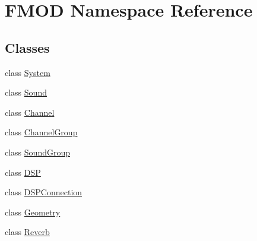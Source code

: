\hypertarget{namespace_f_m_o_d}{\section{F\-M\-O\-D Namespace Reference}
\label{namespace_f_m_o_d}
}
\subsection*{Classes}
\begin{DoxyCompactItemize}
\item 
class \hyperlink{class_f_m_o_d_1_1_system}{System}
\item 
class \hyperlink{class_f_m_o_d_1_1_sound}{Sound}
\item 
class \hyperlink{class_f_m_o_d_1_1_channel}{Channel}
\item 
class \hyperlink{class_f_m_o_d_1_1_channel_group}{Channel\-Group}
\item 
class \hyperlink{class_f_m_o_d_1_1_sound_group}{Sound\-Group}
\item 
class \hyperlink{class_f_m_o_d_1_1_d_s_p}{D\-S\-P}
\item 
class \hyperlink{class_f_m_o_d_1_1_d_s_p_connection}{D\-S\-P\-Connection}
\item 
class \hyperlink{class_f_m_o_d_1_1_geometry}{Geometry}
\item 
class \hyperlink{class_f_m_o_d_1_1_reverb}{Reverb}
\end{DoxyCompactItemize}
